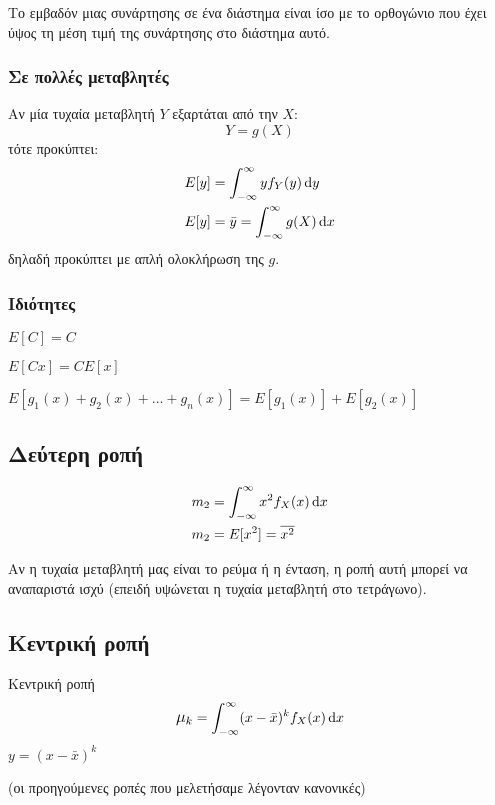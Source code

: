 \documentclass[11pt,a4paper,notitlepage,fleqn,draft]{article}
\begin{document}
Το εμβαδόν μιας συνάρτησης σε ένα διάστημα είναι ίσο με το ορθογώνιο
που έχει ύψος τη μέση τιμή της συνάρτησης στο διάστημα αυτό.

\subsubsection{Σε πολλές μεταβλητές}
Αν μία τυχαία μεταβλητή \( Y \) εξαρτάται από την \( X \):
\[
Y = g(X)
\]
τότε προκύπτει:
\begin{align*}
E[y] &= \int_{-\infty}^{\infty} yf_Y(y)\mathop{}\!\mathrm{d} y \\
E[y] &= \bar y = \int_{-\infty}^{\infty} g(X)\mathop{}\!\mathrm{d} x
\end{align*}
δηλαδή προκύπτει με απλή ολοκλήρωση της \( g \).

\subsubsection{Ιδιότητες}
\begin{enumparen}
	\item \( E[C] = C \)
	\item \( E[Cx] = CE[x] \)
	\item \( E\left[g_1(x)+g_2(x)+\dots+g_n(x)\right] 
	= E\left[g_1(x)\right] + E\left[g_2(x)\right]
	\)
\end{enumparen}

\subsection{Δεύτερη ροπή}
\begin{align*}
	m_2 &= \int_{-\infty}^{\infty} x^2 f_X(x) \mathop{}\!\mathrm{d} x\\
	m_2 &= E[x^2] = \overline{x^2}
\end{align*}

Αν η τυχαία μεταβλητή μας είναι το ρεύμα ή η ένταση, η ροπή αυτή
μπορεί να αναπαριστά ισχύ (επειδή υψώνεται η τυχαία μεταβλητή
στο τετράγωνο).

\subsection{Κεντρική ροπή}
\begin{defn}{Κεντρική ροπή}{}
	\begin{align*}
	\mathlarger{\mu_k}
	 = \int_{-\infty}^{\infty} (x-\bar x)^k f_X(x)\dif x
	\end{align*}
	\( y=(x-\bar x)^k \)
\end{defn}
(οι προηγούμενες ροπές που μελετήσαμε λέγονταν κανονικές)
\end{document}
